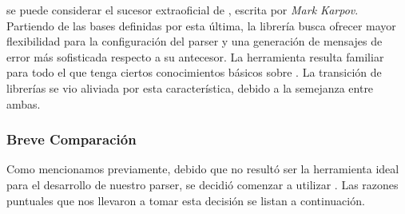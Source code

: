 \Megaparsec{} se puede considerar el sucesor extraoficial de \Parsec{}, escrita por \textit{Mark Karpov}.
Partiendo de las bases definidas por esta última, la librería busca ofrecer mayor flexibilidad para la configuración del parser y una generación de mensajes de error más sofisticada respecto a su antecesor.
La herramienta resulta familiar para todo el que tenga ciertos conocimientos básicos sobre \Parsec{}.
La transición de librerías se vio aliviada por esta característica, debido a la semejanza entre ambas.

\subsubsection{Breve Comparación}

Como mencionamos previamente, debido que \Parsec{} no resultó ser la herramienta ideal para el desarrollo de nuestro parser, se decidió comenzar a utilizar \Megaparsec{}.
Las razones puntuales que nos llevaron a tomar esta decisión se listan a continuación.
